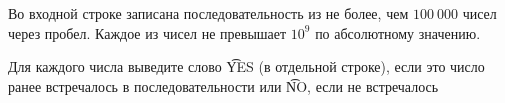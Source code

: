 \InputFile

Во входной строке записана последовательность из не более, чем $100\ 000$
чисел через пробел. Каждое из чисел не превышает $10^9$ по абсолютному значению.

\OutputFile

Для каждого числа выведите слово \t{YES} (в отдельной строке), если это число ранее
встречалось в последовательности или \t{NO}, если не встречалось

\SAMPLES

